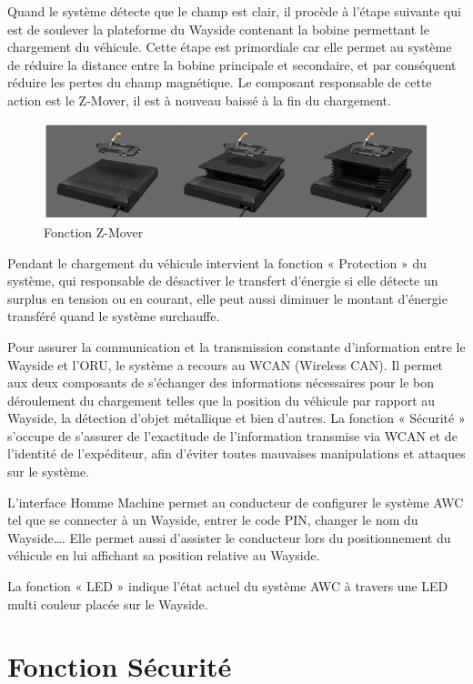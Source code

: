 Quand le système détecte que le champ est clair, il procède à l’étape suivante qui est de soulever la plateforme du Wayside contenant la bobine permettant le chargement du véhicule. Cette étape est primordiale car elle permet au système de réduire la distance entre la bobine principale et secondaire, et par conséquent réduire les pertes du champ magnétique. Le composant responsable de cette action est le Z-Mover, il est à nouveau baissé à la fin du chargement.

\begin{figure}[H]
 \centering
 \includegraphics[scale=0.8]{images/zmover_awc}
 \caption{Fonction Z-Mover}
\end{figure}

Pendant le chargement du véhicule intervient la fonction « Protection » du système, qui responsable de désactiver le transfert d’énergie si elle détecte un surplus en tension ou en courant, elle peut aussi diminuer le montant d’énergie transféré quand le système surchauffe.

Pour assurer la communication et la transmission constante d’information entre le Wayside et l’ORU, le système a recours au WCAN (Wireless CAN). Il permet aux deux composants de s’échanger des informations nécessaires pour le bon déroulement du chargement telles que la position du véhicule par rapport au Wayside, la détection d’objet métallique et bien d’autres. La fonction « Sécurité » s’occupe de s’assurer de l’exactitude de l’information transmise via WCAN et de l’identité de l’expéditeur, afin d’éviter toutes mauvaises manipulations et attaques sur le système.

L’interface Homme Machine permet au conducteur de configurer le système AWC tel que se connecter à un Wayside, entrer le code PIN, changer le nom du Wayside…. Elle permet aussi d’assister le conducteur lors du positionnement du véhicule en lui affichant sa position relative au Wayside.

La fonction « LED » indique l’état actuel du système AWC à travers une LED multi couleur placée sur le Wayside.

\section{Fonction Sécurité}

